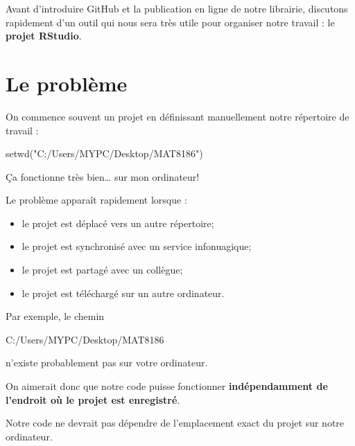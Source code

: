 \documentclass[
  letterpaper,
  DIV=11,
  numbers=noendperiod]{scrreprt}
\newenvironment{Shaded}{\begin{snugshade}}{\end{snugshade}}
\newcommand{\FunctionTok}[1]{\textcolor[rgb]{0.28,0.35,0.67}{#1}}
\newcommand{\NormalTok}[1]{\textcolor[rgb]{0.00,0.23,0.31}{#1}}
\newcommand{\StringTok}[1]{\textcolor[rgb]{0.13,0.47,0.30}{#1}}
\providecommand{\tightlist}{%
  \setlength{\itemsep}{0pt}\setlength{\parskip}{0pt}}\usepackage{longtable,booktabs,array}
\begin{document}
Avant d'introduire GitHub et la publication en ligne de notre librairie,
discutons rapidement d'un outil qui nous sera très utile pour organiser
notre travail : le \textbf{projet RStudio}.

\section{Le problème}\label{le-probluxe8me}

On commence souvent un projet en définissant manuellement notre
répertoire de travail :

\begin{Shaded}
\begin{Highlighting}[]
\FunctionTok{setwd}\NormalTok{(}\StringTok{"C:/Users/MYPC/Desktop/MAT8186"}\NormalTok{)}
\end{Highlighting}
\end{Shaded}

Ça fonctionne très bien\ldots{} sur mon ordinateur!

Le problème apparaît rapidement lorsque :

\begin{itemize}
\tightlist
\item
  le projet est déplacé vers un autre répertoire;
\item
  le projet est synchronisé avec un service infonuagique;
\item
  le projet est partagé avec un collègue;
\item
  le projet est téléchargé sur un autre ordinateur.
\end{itemize}

Par exemple, le chemin

\begin{Shaded}
\begin{Highlighting}[]
\NormalTok{C:/Users/MYPC/Desktop/MAT8186}
\end{Highlighting}
\end{Shaded}

n'existe probablement pas sur votre ordinateur.

On aimerait donc que notre code puisse fonctionner
\textbf{indépendamment de l'endroit où le projet est enregistré}.

\begin{tcolorbox}[enhanced jigsaw, arc=.35mm, title=\textcolor{quarto-callout-important-color}{\faExclamation}\hspace{0.5em}{Un principe important}, colback=white, left=2mm, rightrule=.15mm, toptitle=1mm, opacityback=0, bottomtitle=1mm, breakable, colframe=quarto-callout-important-color-frame, coltitle=black, toprule=.15mm, titlerule=0mm, opacitybacktitle=0.6, bottomrule=.15mm, colbacktitle=quarto-callout-important-color!10!white, leftrule=.75mm]

Notre code ne devrait pas dépendre de l'emplacement exact du projet sur
notre ordinateur.

\end{tcolorbox}
\end{document}
